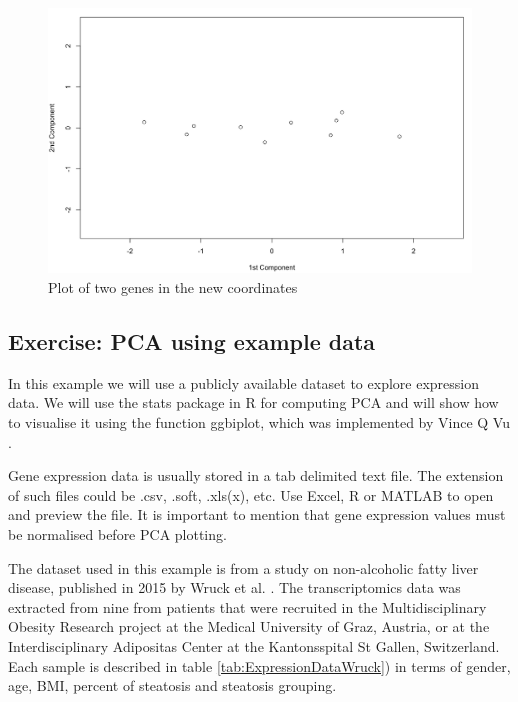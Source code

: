 \documentclass[11pt, oneside]{article}   	%
\begin{document}
\begin{figure}[!h]
	\includegraphics[width=\textwidth]{example1_plot_2PC}
	\caption{Plot of two genes in the new coordinates}
	\label{fig:PlotTwoGenesNewCoordiantes}
\end{figure}




\subsection{Exercise: PCA using example data}


In this example we will use a publicly available dataset to explore expression data. We will use the stats package in R for computing PCA and will show how to visualise it using the function ggbiplot, which was implemented by Vince Q Vu \cite{Vu2016}. 


Gene expression data is usually stored in a tab delimited text file. The extension of such files could be .csv, .soft, .xls(x), etc. Use Excel, R or MATLAB to open and preview the file. It is important to mention that gene expression values must be normalised before PCA plotting.

The dataset used in this example is from a study on non-alcoholic fatty liver disease, published in 2015 by Wruck et al. \cite{Wruck2015}. The transcriptomics data was extracted from nine from patients that were recruited in the Multidisciplinary Obesity Research project at the Medical University of Graz, Austria, or at the Interdisciplinary Adipositas Center at the Kantonsspital St Gallen, Switzerland. Each sample is described in table \ref{tab:ExpressionDataWruck}) in terms of gender, age, BMI, percent of steatosis and steatosis grouping.
\end{document}
